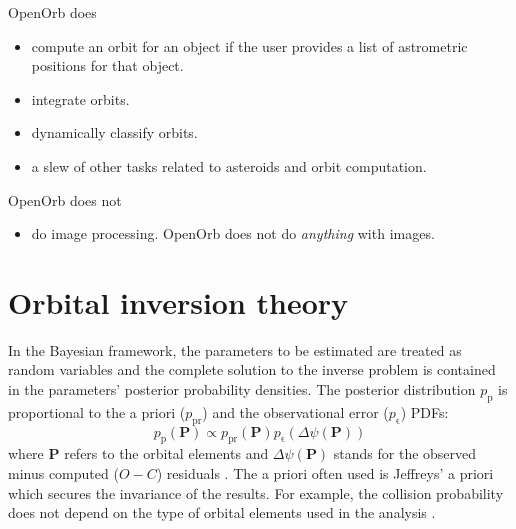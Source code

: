 \documentclass[12pt,english,twoside,a4paper]{report}
\begin{document}
\noindent OpenOrb does
\begin{itemize}

\item compute an orbit for an object if the user provides a list of
  astrometric positions for that object.

\item integrate orbits.

\item dynamically classify orbits.

\item a slew of other tasks related to asteroids and orbit
  computation.

\end{itemize}


\noindent OpenOrb does not
\begin{itemize}

\item do image processing. OpenOrb does not do \emph{anything} with images.

\end{itemize}


\section{Orbital inversion theory}

In the Bayesian framework, the parameters to be estimated are treated
as random variables and the complete solution to the inverse problem
is contained in the parameters' posterior probability densities. The
posterior distribution $p_\mathrm{p}$ is proportional to the a priori
($p_\mathrm{pr}$) and the observational error ($p_\mathrm{\epsilon}$)
PDFs:
\begin{equation}
p_\mathrm{p}(\mathbf{P}) \propto p_\mathrm{pr}(\mathbf{P}) p_\mathrm{\epsilon}(\Delta
\psi (\mathbf{P}))
\end{equation}
where $\mathbf{P}$ refers to the orbital elements and $\Delta \psi
(\mathbf{P})$ stands for the observed minus computed ($O-C$) residuals
\cite{mui1993a,vir2005c}. The a priori often used is Jeffreys' a
priori which secures the invariance of the results. For example, the
collision probability does not depend on the type of orbital elements
used in the analysis \cite{vir2006a}.
\end{document}
